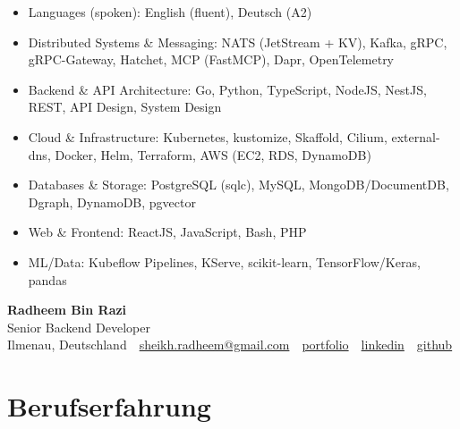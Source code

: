 \documentclass[10pt,a4paper]{resume}
\makeatletter
\newcommand{\Portfolio}{https://radheem.github.io/my-cv}
\newcommand{\PortfolioText}{portfolio}
\newcommand{\GitHub}{https://github.com/radheem}
\newcommand{\LinkedIn}{https://www.linkedin.com/in/radheem-razi}
\newcommand{\Email}{sheikh.radheem@gmail.com}
\makeatother
\begin{document}
\begin{itemize}[leftmargin=1.4em,nosep,topsep=2pt]
  \item Languages (spoken): English (fluent), Deutsch (A2)
  \item Distributed Systems \& Messaging: NATS (JetStream + KV), Kafka, gRPC, gRPC-Gateway, Hatchet, MCP (FastMCP), Dapr, OpenTelemetry
  \item Backend \& API Architecture: Go, Python, TypeScript, NodeJS, NestJS, REST, API Design, System Design
  \item Cloud \& Infrastructure: Kubernetes, kustomize, Skaffold, Cilium, external-dns, Docker, Helm, Terraform, AWS (EC2, RDS, DynamoDB)
  \item Databases \& Storage: PostgreSQL (sqlc), MySQL, MongoDB/DocumentDB, Dgraph, DynamoDB, pgvector
  \item Web \& Frontend: ReactJS, JavaScript, Bash, PHP
  \item ML/Data: Kubeflow Pipelines, KServe, scikit-learn, TensorFlow/Keras, pandas
\end{itemize}

\clearpage
{}

\begin{center}
  {\huge\bfseries Radheem Bin Razi}\\[3pt]
  {\large Senior Backend Developer}\\[6pt]
  \small
  Ilmenau, Deutschland \,\textbar\,
  \href{mailto:\Email}{\Email} \,\textbar\,
  \href{\Portfolio}{\PortfolioText} \,\textbar\,
  \href{\LinkedIn}{linkedin} \,\textbar\,
  \href{\GitHub}{github}
\end{center}
\vspace{2pt}

\section{Berufserfahrung}
\end{document}
